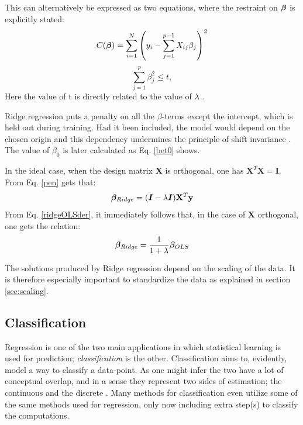 This can alternatively be expressed as two equations, where the restraint on $\boldsymbol{\beta}$ is explicitly stated:
\begin{equation}\label{ridge_alt}
    C(\boldsymbol{\beta}) = \sum_{i=1}^N \left(y_i - \sum_{j=1}^{p-1} X_{ij}\beta_j \right)^2
\end{equation}
\begin{equation}\label{ridge_constraint}
    \sum_{j=1}^p \beta_j^2 \leq t, 
\end{equation}
Here the value of t is directly related to the value of $\lambda$ \citep[p. 63]{hastie}.

Ridge regression puts a penalty on all the $\beta$-terms except the intercept, which is held out during training. Had it been included, the model would depend on the chosen origin and this dependency undermines the principle of shift invariance \citep[p. 63]{hastie}.
The value of $\beta_0$ is later calculated as Eq. \ref{bet0}  shows. 

In the ideal case, when the design matrix $\mathbf{X}$ is orthogonal, one has $\mathbf{X}^T\mathbf{X} = \boldsymbol{I}$. From Eq. \ref{pen} gets that:
\begin{equation}\label{ridgeOLSder}
    \boldsymbol{\beta}_{Ridge} = (\boldsymbol{I} - \lambda\boldsymbol{I}) \mathbf{X}^T \mathbf{y}
\end{equation}
From Eq. \ref{ridgeOLSder}, it immediately follows that, in the case of $\mathbf{X}$ orthogonal, one gets the relation:
\begin{equation}\label{ridgeOLS}
    \boldsymbol{\beta}_{Ridge} = \frac{1}{1+\lambda}\boldsymbol{\beta}_{OLS}
\end{equation}

The solutions produced by Ridge regression depend on the scaling of the data. It is therefore especially important to standardize the data as explained in section \ref{sec:scaling}. 



\subsection{Classification }
Regression is one of the two main applications in which statistical learning is used for prediction; \textit{classification} is the other. Classification aims to, evidently, model a way to classify a data-point. As one might infer the two have a lot of conceptual overlap, and in a sense they represent two sides of estimation; the continuous and the discrete \cite[p. 10]{hastie}. 
Many methods for classification even utilize some of the same methods used for regression, only now including extra step(s) to classify the computations.

